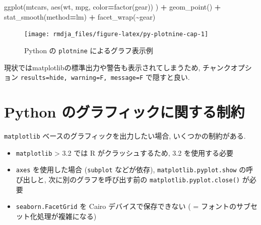 \documentclass[
  xelatex,ja=standard,jafont=noto]{bxjsbook}
\newenvironment{Shaded}{\begin{snugshade}}{\end{snugshade}}
\newcommand{\NormalTok}[1]{#1}
\newcommand{\OperatorTok}[1]{\textcolor[rgb]{0.81,0.36,0.00}{\textbf{#1}}}
\newcommand{\StringTok}[1]{\textcolor[rgb]{0.31,0.60,0.02}{#1}}
\providecommand{\tightlist}{%
  \setlength{\itemsep}{0pt}\setlength{\parskip}{0pt}}
\theoremstyle{definition}
\theoremstyle{definition}
\theoremstyle{definition}
\theoremstyle{definition}
\theoremstyle{remark}
\begin{document}
\begin{Shaded}
\begin{Highlighting}[numbers=left,,]
\NormalTok{ggplot(mtcars, aes(}\StringTok{\textquotesingle{}wt\textquotesingle{}}\NormalTok{, }\StringTok{\textquotesingle{}mpg\textquotesingle{}}\NormalTok{, color}\OperatorTok{=}\StringTok{\textquotesingle{}factor(gear)\textquotesingle{}}\NormalTok{)}
\NormalTok{) }\OperatorTok{+}\NormalTok{ geom\_point() }\OperatorTok{+}\NormalTok{ stat\_smooth(method}\OperatorTok{=}\StringTok{\textquotesingle{}lm\textquotesingle{}}\NormalTok{) }\OperatorTok{+}\NormalTok{ facet\_wrap(}\StringTok{\textquotesingle{}\textasciitilde{}gear\textquotesingle{}}\NormalTok{)}
\end{Highlighting}
\end{Shaded}

\begin{figure}

{\centering \texttt{[image: rmdja\_files/figure-latex/py-plotnine-cap-1]} 

}

\caption{Python の \texttt{plotnine} によるグラフ表示例}\label{fig:py-plotnine-cap}
\end{figure}

現状ではmatplotlibの標準出力や警告も表示されてしまうため,
チャンクオプション
\texttt{results=\textquotesingle{}hide\textquotesingle{},\ warning=F,\ message=F}
で隠すと良い.

\hypertarget{python-ux306eux30b0ux30e9ux30d5ux30a3ux30c3ux30afux306bux95a2ux3059ux308bux5236ux7d04}{%
\section{Python
のグラフィックに関する制約}\label{python-ux306eux30b0ux30e9ux30d5ux30a3ux30c3ux30afux306bux95a2ux3059ux308bux5236ux7d04}}

\texttt{matplotlib} ベースのグラフィックを出力したい場合,
いくつかの制約がある.

\begin{itemize}
\tightlist
\item
  \texttt{matplotlib} \textgreater{} 3.2 では R がクラッシュするため,
  3.2 を使用する必要
\item
  \texttt{axes} を使用した場合 (\texttt{subplot} などが依存),
  \texttt{matplotlib.pyplot.show} の呼び出しと,
  次に別のグラフを呼び出す前の \texttt{matplotlib.pyplot.close()} が必要
\item
  \texttt{seaborn.FacetGrid} を Cairo デバイスで保存できない ( =
  フォントのサブセット化処理が複雑になる)
\end{itemize}
\end{document}
